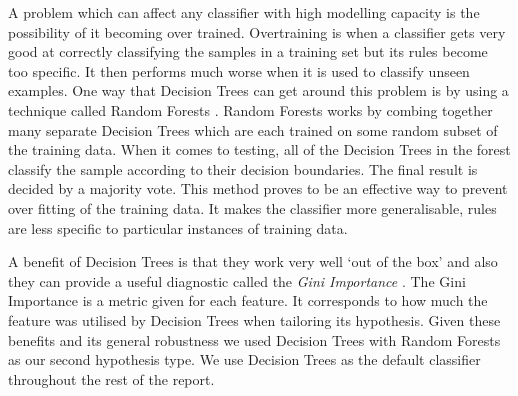 \documentclass[12pt]{IIBproject}
\begin{document}
A problem which can affect any classifier with high modelling capacity is the possibility of it becoming over trained. Overtraining is when a classifier gets very good at correctly classifying the samples in a training set but its rules become too specific. It then performs much worse when it is used to classify unseen examples. One way that Decision Trees can get around this problem is by using a technique called Random Forests \cite{breiman2001random}. Random Forests works by combing together many separate Decision Trees which are each trained on some random subset of the training data. When it comes to testing, all of the Decision Trees in the forest classify the sample according to their decision boundaries. The final result is decided by a majority vote. This method proves to be an effective way to prevent over fitting of the training data. It makes the classifier more generalisable, rules are less specific to particular instances of training data. 

A benefit of Decision Trees is that they work very well `out of the box' and also they can provide a useful diagnostic called the \emph{Gini Importance} \cite{menze2009comparison}. The Gini Importance is a metric given for each feature. It corresponds to how much the feature was utilised by Decision Trees when tailoring its hypothesis. Given these benefits and its general robustness we used Decision Trees with Random Forests as our second hypothesis type. We use Decision Trees as the default classifier throughout the rest of the report.
\end{document}
